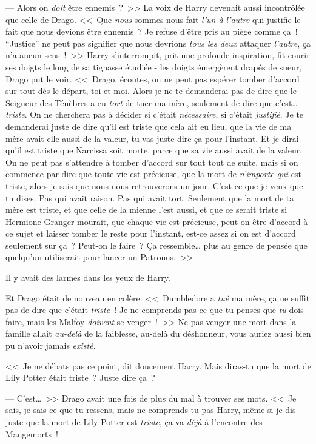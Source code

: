 --- Alors on \emph{doit} être ennemis~?~>> La voix de Harry devenait aussi incontrôlée que celle de Drago. <<~Que \emph{nous} sommes-nous fait \emph{l'un à l'autre} qui justifie le fait que nous devions être ennemis~? Je refuse d'être pris au piège comme ça~! “Justice” ne peut pas signifier que nous devrions \emph{tous les deux} attaquer \emph{l'autre}, ça n'a aucun sens~!~>> Harry s'interrompit, prit une profonde inspiration, fit courir ses doigts le long de sa tignasse étudiée - les doigts émergèrent drapés de sueur, Drago put le voir. <<~Drago, écoutes, on ne peut pas espérer tomber d'accord sur tout dès le départ, toi et moi. Alors je ne te demanderai pas de dire que le Seigneur des Ténèbres a eu \emph{tort} de tuer ma mère, seulement de dire que c'est… \emph{triste}. On ne cherchera pas à décider si c'était \emph{nécessaire}, si c'était \emph{justifié}. Je te demanderai juste de dire qu'il est triste que cela ait eu lieu, que la vie de ma mère avait elle aussi de la valeur, tu vas juste dire ça pour l'instant. Et je dirai qu'il est triste que Narcissa soit morte, parce que sa vie aussi avait de la valeur. On ne peut pas s'attendre à tomber d'accord sur tout tout de suite, mais si on commence par dire que toute vie est précieuse, que la mort de \emph{n'importe qui} est triste, alors je sais que nous nous retrouverons un jour. C'est ce que je veux que tu dises. Pas qui avait raison. Pas qui avait tort. Seulement que la mort de ta mère est triste, et que celle de la mienne l'est aussi, et que ce serait triste si Hermione Granger mourait, que chaque vie est précieuse, peut-on être d'accord à ce sujet et laisser tomber le reste pour l'instant, est-ce assez si on est d'accord seulement sur ça~? Peut-on le faire~? Ça ressemble… plus au genre de pensée que quelqu'un utiliserait pour lancer un Patronus.~>>

Il y avait des larmes dans les yeux de Harry.

Et Drago était de nouveau en colère. <<~Dumbledore a \emph{tué} ma mère, ça ne suffit pas de dire que c'était \emph{triste}~! Je ne comprends pas ce que tu penses que \emph{tu} dois faire, mais les Malfoy \emph{doivent} se venger~!~>> Ne pas venger une mort dans la famille allait \emph{au-delà} de la faiblesse, au-delà du déshonneur, vous auriez aussi bien pu n'avoir jamais \emph{existé}.

<<~Je ne débats pas ce point, dit doucement Harry. Mais diras-tu que la mort de Lily Potter était triste~? Juste dire ça~?

--- C'est…~>> Drago avait une fois de plus du mal à trouver ses mots. <<~Je sais, je sais ce que tu ressens, mais ne comprends-tu pas Harry, même si je dis juste que la mort de Lily Potter est \emph{triste}, ça va \emph{déjà} à l'encontre des Mangemorts~!

